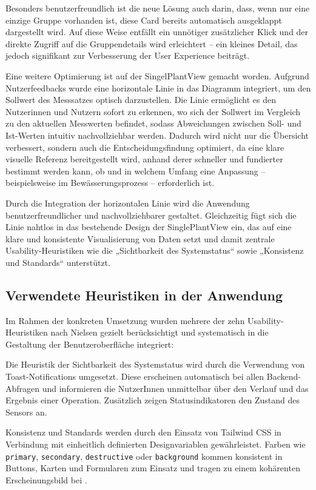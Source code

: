 Besonders benutzerfreundlich ist die neue Lösung auch darin, dass, wenn nur eine einzige Gruppe vorhanden ist, diese Card bereits automatisch ausgeklappt dargestellt wird. Auf diese Weise entfällt ein unnötiger zusätzlicher Klick und der direkte Zugriff auf die Gruppendetails wird erleichtert – ein kleines Detail, das jedoch signifikant zur Verbesserung der User Experience beiträgt.

Eine weitere Optimierung ist auf der SingelPlantView gemacht worden.
Aufgrund Nutzerfeedbacks wurde eine horizontale Linie in das Diagramm integriert, um den Sollwert des Messsatzes optisch darzustellen. Die Linie ermöglicht es den Nutzerinnen und Nutzern sofort zu erkennen, wo sich der Sollwert im Vergleich zu den aktuellen Messwerten befindet, sodass Abweichungen zwischen Soll- und Ist-Werten intuitiv nachvollziehbar werden. Dadurch wird nicht nur die Übersicht verbessert, sondern auch die Entscheidungsfindung optimiert, da eine klare visuelle Referenz bereitgestellt wird, anhand derer schneller und fundierter bestimmt werden kann, ob und in welchem Umfang eine Anpassung – beispielsweise im Bewässerungsprozess – erforderlich ist.

Durch die Integration der horizontalen Linie wird die Anwendung benutzerfreundlicher und nachvollziehbarer gestaltet. Gleichzeitig fügt sich die Linie nahtlos in das bestehende Design der SinglePlantView ein, das auf eine klare und konsistente Visualisierung von Daten setzt und damit zentrale Usability-Heuristiken wie die „Sichtbarkeit des Systemstatus“ sowie „Konsistenz und Standards“ unterstützt.


\subsection{Verwendete Heuristiken in der Anwendung}

Im Rahmen der konkreten Umsetzung wurden mehrere der zehn Usability-Heuristiken nach Nielsen gezielt berücksichtigt und systematisch in die Gestaltung der Benutzeroberfläche integriert:

Die Heuristik der Sichtbarkeit des Systemstatus wird durch die Verwendung von Toast-Notifications umgesetzt. Diese erscheinen automatisch bei allen Backend-Abfragen und informieren die NutzerInnen unmittelbar über den Verlauf und das Ergebnis einer Operation. Zusätzlich zeigen Statusindikatoren den Zustand des Sensors an.

Konsistenz und Standards werden durch den Einsatz von Tailwind CSS in Verbindung mit einheitlich definierten Designvariablen gewährleistet. Farben wie \texttt{primary}, \texttt{secondary}, \texttt{destructive} oder \texttt{background} kommen konsistent in Buttons, Karten und Formularen zum Einsatz und tragen zu einem kohärenten Erscheinungsbild bei \cite{TailwindCSS}.

